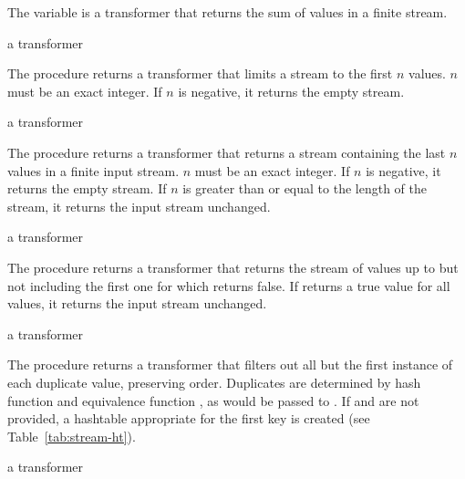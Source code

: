 The  variable is a transformer that returns the sum of values in a finite
stream.

\begin{procedure}
\end{procedure}
\returns{} a transformer

The  procedure returns a transformer that limits a stream to the first $n$
values. $n$ must be an exact integer. If $n$ is negative, it returns the empty stream.

\begin{procedure}
\end{procedure}
\returns{} a transformer

The  procedure returns a transformer that returns a stream containing
the last $n$ values in a finite input stream. $n$ must be an exact integer. If $n$ is
negative, it returns the empty stream. If $n$ is greater than or equal to the length of
the stream, it returns the input stream unchanged.

\begin{procedure}
\end{procedure}
\returns{} a transformer

The  procedure returns a transformer that returns the stream of values
up to but not including the first one for which  returns false. If
 returns a true value for all values, it returns the input stream
unchanged.

\begin{procedure}
\end{procedure}
\returns{} a transformer

The  procedure returns a transformer that filters out all but the first
instance of each duplicate value, preserving order. Duplicates are determined by hash
function  and equivalence function , as would be passed to
. If  and  are not provided, a hashtable
appropriate for the first key is created (see Table~\ref{tab:stream-ht}).

\begin{procedure}
\end{procedure}
\returns{} a transformer

